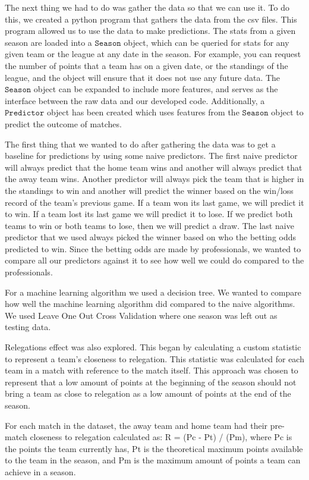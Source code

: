 \documentclass[conference]{IEEEtran}
\begin{document}
The next thing we had to do was gather the data so that we can use it. To do this, we created a python program that gathers the data from the csv files. This program allowed us to use the data to make predictions. The stats from a given season are loaded into a $\mathtt{Season}$ object, which can be queried for stats for any given team or the league at any date in the season. For example, you can request the number of points that a team has on a given date, or the standings of the league, and the object will ensure that it does not use any future data. The $\mathtt{Season}$ object can be expanded to include more features, and serves as the interface between the raw data and our developed code. Additionally, a $\mathtt{Predictor}$ object has been created which uses features from the $\mathtt{Season}$ object to predict the outcome of matches.

The first thing that we wanted to do after gathering the data was to get a baseline for predictions by using some naive predictors. The first naive predictor will always predict that the home team wins and another will always predict that the away team wins. Another predictor will always pick the team that is higher in the standings to win and another will predict the winner based on the win/loss record of the team's previous game. If a team won its last game, we will predict it to win. If a team lost its last game we will predict it to lose. If we predict both teams to win or both teams to lose, then we will predict a draw. The last naive predictor that we used always picked the winner based on who the betting odds predicted to win. Since the betting odds are made by professionals, we wanted to compare all our predictors against it to see how well we could do compared to the professionals.

For a machine learning algorithm we used a decision tree. We wanted to compare how well the machine learning algorithm did compared to the naive algorithms. We used Leave One Out Cross Validation where one season was left out as testing data.

Relegations effect was also explored. This began by calculating a custom statistic to represent a team's closeness to relegation. This statistic was calculated for each team in a match with reference to the match itself. This approach was chosen to represent that a low amount of points at the beginning of the season should not bring a team as close to relegation as a low amount of points at the end of the season.

For each match in the dataset, the away team and home team had their pre-match closeness to relegation calculated as: R = (Pc - Pt) / (Pm), where Pc is the points the team currently has, Pt is the theoretical maximum points available to the team in the season, and Pm is the maximum amount of points a team can achieve in a season. 
\end{document}
